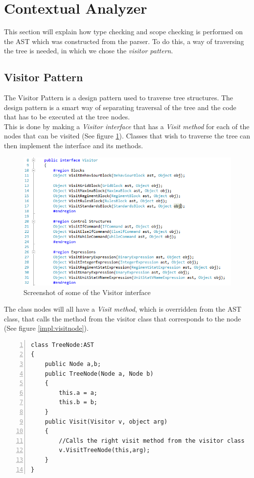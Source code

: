 \section{Contextual Analyzer}
	This section will explain how type checking and scope checking is performed on the AST which was constructed from the parser.
	To do this, a way of traversing the tree is needed, in which we chose the \textit{visitor pattern}.
	
	\subsection{Visitor Pattern}\label{impl:visitorinterface}
		The Visitor Pattern is a design pattern used to traverse tree structures. 
		The design pattern is a smart way of separating traversal of the tree and the code that has to be executed at the tree nodes. \\
		This is done by making a {\it Visitor interface} that has a {\it Visit method} for each of the nodes that 
		can be visited (See figure \ref{impl:visitor}). Classes that wish to traverse the tree can then implement the interface and its methods.
		\begin{figure}[H]
		\center
			\includegraphics[scale=0.8]{rapport/6/figures/visitorinterface.png}
			\caption{Screenshot of some of the Visitor interface}
			\label{impl:visitor}
		\end{figure}
	
		The class nodes will all have a {\it Visit method}, 
		which is overridden from the AST class, that calls the method from the visitor class 
		that corresponds to the node (See figure \ref{impl:visitnode}). 
			\begin{lstlisting}[basicstyle=\small\sffamily,
					keywords={break,case,const,continue,default,else,enum,
					for,if,return,switch,while,do,long,void,int,float,double,
					char,struct,typedef,include,size\_t},
					keywordstyle={\color{blue}},
					comment={[l]{//}}, morecomment={[s]{/*}{*/}}, commentstyle=\itshape,
					columns={[l]flexible}, numbers=left, numberstyle=\tiny,
					frameround=fftt, frame=shadowbox, captionpos=b,
					caption={Example of a node class with a Visit method},
					label=impl:visitnode]
class TreeNode:AST
{
	public Node a,b;
	public TreeNode(Node a, Node b)
	{
		this.a = a;
		this.b = b;
	}
	public Visit(Visitor v, object arg)
	{
		//Calls the right visit method from the visitor class
		v.VisitTreeNode(this,arg);
	}
}
			 \end{lstlisting}
	
